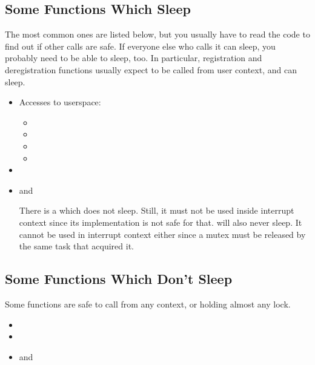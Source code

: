 \documentclass[a4paper,8pt,english]{sphinxmanual}
\begin{document}
\subsection{Some Functions Which Sleep}
\label{kernel-hacking/locking:some-functions-which-sleep}
The most common ones are listed below, but you usually have to read the
code to find out if other calls are safe. If everyone else who calls it
can sleep, you probably need to be able to sleep, too. In particular,
registration and deregistration functions usually expect to be called
from user context, and can sleep.
\begin{itemize}
\item {} 
Accesses to userspace:
\begin{itemize}
\item {} 

\item {} 

\item {} 

\item {} 

\end{itemize}

\item {} 

\item {} 
{\hyperref[kernel\string-hacking/locking:c.mutex_lock_interruptible]{\emph{}}} and
{\hyperref[kernel\string-hacking/locking:c.mutex_lock]{\emph{}}}

There is a {\hyperref[kernel\string-hacking/locking:c.mutex_trylock]{\emph{}}} which does not sleep.
Still, it must not be used inside interrupt context since its
implementation is not safe for that. {\hyperref[kernel\string-hacking/locking:c.mutex_unlock]{\emph{}}}
will also never sleep. It cannot be used in interrupt context either
since a mutex must be released by the same task that acquired it.

\end{itemize}


\subsection{Some Functions Which Don't Sleep}
\label{kernel-hacking/locking:some-functions-which-don-t-sleep}
Some functions are safe to call from any context, or holding almost any
lock.
\begin{itemize}
\item {} 

\item {} 

\item {} 
 and 

\end{itemize}
\end{document}
